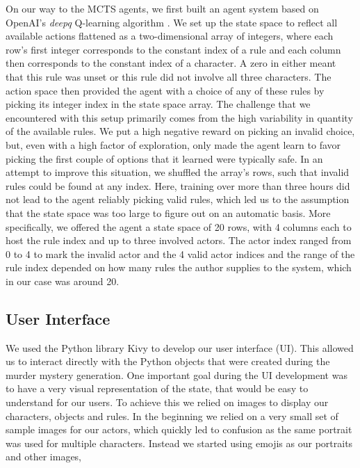 On our way to the MCTS agents, we first built an agent system based on OpenAI's \emph{deepq} Q-learning algorithm . We set up the state space to reflect all available actions flattened as a two-dimensional array of integers, where each row's first integer corresponds to the constant index of a rule and each column then corresponds to the constant index of a character. A zero in either meant that this rule was unset or this rule did not involve all three characters. The action space then provided the agent with a choice of any of these rules by picking its integer index in the state space array. The challenge that we encountered with this setup primarily comes from the high variability in quantity of the available rules. We put a high negative reward on picking an invalid choice, but, even with a high factor of exploration, only made the agent learn to favor picking the first couple of options that it learned were typically safe. In an attempt to improve this situation, we shuffled the array's rows, such that invalid rules could be found at any index. Here, training over more than three hours did not lead to the agent reliably picking valid rules, which led us to the assumption that the state space was too large to figure out on an automatic basis. More specifically, we offered the agent a state space of 20 rows, with 4 columns each to host the rule index and up to three involved actors. The actor index ranged from 0 to 4 to mark the invalid actor and the 4 valid actor indices and the range of the rule index depended on how many rules the author supplies to the system, which in our case was around 20.

\subsection{User Interface} \label{user_interface}

We used the Python library Kivy to develop our user interface (UI).
This allowed us to interact directly with the Python objects that were created during the murder mystery generation.
One important goal during the UI development was to have a very visual representation of the state, that would be easy to understand for our users.
To achieve this we relied on images to display our characters, objects and rules.
In the beginning we relied on a very small set of sample images for our actors, which quickly led to confusion as the same portrait was used for multiple characters.
Instead we started using emojis as our portraits and other images,
